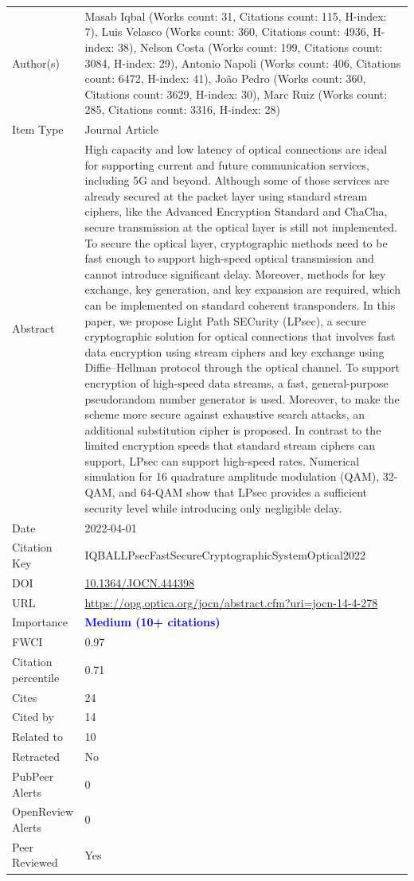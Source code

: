 \documentclass{article}
\begin{document}
\begin{enumerate}[label=\arabic*., font=\Large]
\begin{longtable}{p{} p{\contentcolwidth-2\tabcolsep}}
\toprule
Author(s) & Masab Iqbal (Works count: 31, Citations count: 115, H-index: 7), Luis Velasco (Works count: 360, Citations count: 4936, H-index: 38), Nelson Costa (Works count: 199, Citations count: 3084, H-index: 29), Antonio Napoli (Works count: 406, Citations count: 6472, H-index: 41), João Pedro (Works count: 360, Citations count: 3629, H-index: 30), Marc Ruiz (Works count: 285, Citations count: 3316, H-index: 28) \\
Item Type & Journal Article \\
Abstract & High capacity and low latency of optical connections are ideal for supporting current and future communication services, including 5G and beyond. Although some of those services are already secured at the packet layer using standard stream ciphers, like the Advanced Encryption Standard and ChaCha, secure transmission at the optical layer is still not implemented. To secure the optical layer, cryptographic methods need to be fast enough to support high-speed optical transmission and cannot introduce significant delay. Moreover, methods for key exchange, key generation, and key expansion are required, which can be implemented on standard coherent transponders. In this paper, we propose Light Path SECurity (LPsec), a secure cryptographic solution for optical connections that involves fast data encryption using stream ciphers and key exchange using Diffie--Hellman protocol through the optical channel. To support encryption of high-speed data streams, a fast, general-purpose pseudorandom number generator is used. Moreover, to make the scheme more secure against exhaustive search attacks, an additional substitution cipher is proposed. In contrast to the limited encryption speeds that standard stream ciphers can support, LPsec can support high-speed rates. Numerical simulation for 16 quadrature amplitude modulation (QAM), 32-QAM, and 64-QAM show that LPsec provides a sufficient security level while introducing only negligible delay. \\
Date & 2022-04-01 \\
Citation Key & IQBALLPsecFastSecureCryptographicSystemOptical2022 \\
DOI & \href{http://doi.org/10.1364/JOCN.444398}{10.1364/JOCN.444398} \\
URL & \url{https://opg.optica.org/jocn/abstract.cfm?uri=jocn-14-4-278} \\
Importance & \textbf{\textcolor{blue}{Medium (10+ citations)}} \\
FWCI & 0.97 \\
Citation percentile & 0.71 \\
Cites & 24 \\
Cited by & 14 \\
Related to & 10 \\
Retracted & No \\
PubPeer Alerts & 0 \\
OpenReview Alerts & 0 \\
Peer Reviewed & Yes \\
\bottomrule
\end{longtable}


\end{enumerate}
\end{document}

